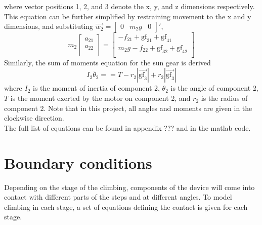 where vector positions 1, 2, and 3 denote the x, y, and z dimensions respectively. This equation can be further simplified by restraining movement to the x and y dimensions, and substituting $\vec{w_2} = \begin{bmatrix} 0 & m_2g & 0 \end{bmatrix}'$,
\begin{equation}
	m_2
	\begin{bmatrix}
		a_{21}\\
		a_{22}\\
	\end{bmatrix}
	=
	\begin{bmatrix}
		-f_{21}+\mathrm{gf}_{31}+\mathrm{gf}_{41}\\
		m_2g-f_{22}+\mathrm{gf}_{32}+\mathrm{gf}_{42}\\
	\end{bmatrix}
\end{equation}
Similarly, the sum of moments equation for the sun gear is derived
\begin{equation}
	I_2\ddot{\theta_2} == T - r_2|\vec{\mathrm{gf}_3}| + r_2|\vec{\mathrm{gf}_3}|
\end{equation}
where $I_2$ is the moment of inertia of component 2, $\theta_2$ is the angle of component 2, $T$ is the moment exerted by the motor on component 2, and $r_2$ is the radius of component 2. Note that in this project, all angles and moments are given in the clockwise direction.
\\
The full list of equations can be found in appendix ??? and in the matlab code.



\section{Boundary conditions}
Depending on the stage of the climbing, components of the device will come into contact with different parts of the steps and at different angles. To model climbing in each stage, a set of equations defining the contact is given for each stage.\\

